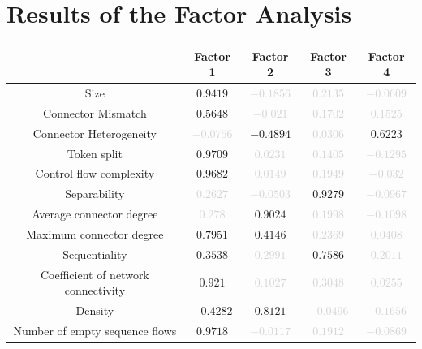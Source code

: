 \documentclass[a4paper]{article}
\begin{document}
\section*{Results of the Factor Analysis}
\begin{center}
\begin{tabular}{ccccc} \toprule 
 & Factor 1 & Factor 2 & Factor 3 & Factor 4 \\ \midrule 
Size & $0.9419$ & \textcolor{lightgray}{$-0.1856$} & \textcolor{lightgray}{$0.2135$} & \textcolor{lightgray}{$-0.0609$} \\ 
Connector Mismatch & $0.5648$ & \textcolor{lightgray}{$-0.021$} & \textcolor{lightgray}{$0.1702$} & \textcolor{lightgray}{$0.1525$} \\ 
Connector Heterogeneity & \textcolor{lightgray}{$-0.0756$} & $-0.4894$ & \textcolor{lightgray}{$0.0306$} & $0.6223$ \\ 
Token split & $0.9709$ & \textcolor{lightgray}{$0.0231$} & \textcolor{lightgray}{$0.1405$} & \textcolor{lightgray}{$-0.1295$} \\ 
Control flow complexity & $0.9682$ & \textcolor{lightgray}{$0.0149$} & \textcolor{lightgray}{$0.1949$} & \textcolor{lightgray}{$-0.032$} \\ 
Separability & \textcolor{lightgray}{$0.2627$} & \textcolor{lightgray}{$-0.0503$} & $0.9279$ & \textcolor{lightgray}{$-0.0967$} \\ 
Average connector degree & \textcolor{lightgray}{$0.278$} & $0.9024$ & \textcolor{lightgray}{$0.1998$} & \textcolor{lightgray}{$-0.1098$} \\ 
Maximum connector degree & $0.7951$ & $0.4146$ & \textcolor{lightgray}{$0.2369$} & \textcolor{lightgray}{$0.0408$} \\ 
Sequentiality & $0.3538$ & \textcolor{lightgray}{$0.2991$} & $0.7586$ & \textcolor{lightgray}{$0.2011$} \\ 
Coefficient of network connectivity & $0.921$ & \textcolor{lightgray}{$0.1027$} & \textcolor{lightgray}{$0.3048$} & \textcolor{lightgray}{$0.0255$} \\ 
Density & $-0.4282$ & $0.8121$ & \textcolor{lightgray}{$-0.0496$} & \textcolor{lightgray}{$-0.1656$} \\ 
Number of empty sequence flows & $0.9718$ & \textcolor{lightgray}{$-0.0117$} & \textcolor{lightgray}{$0.1912$} & \textcolor{lightgray}{$-0.0869$} \\ 
\bottomrule
\end{tabular}
\end{center}
\end{document}
